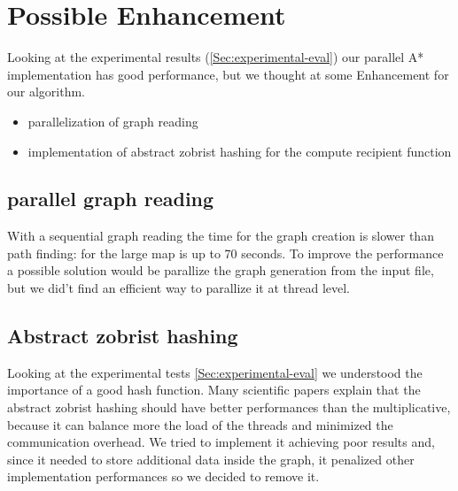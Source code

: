 \section{Possible Enhancement}
\label{Sec:enhancement}

Looking at the experimental results (\ref{Sec:experimental-eval}) our parallel A* implementation has good performance, 
but we thought at some Enhancement for our algorithm.

\begin{itemize}
    \item parallelization of graph reading
    \item implementation of abstract zobrist hashing for the compute recipient function
\end{itemize}

\subsection{parallel graph reading}

With a sequential graph reading the time for the graph creation is slower than path finding: for the large map is up to 70 seconds.
To improve the performance a possible solution would be parallize the graph generation from the input file, 
but we did't find an efficient way to parallize it at thread level.


\subsection{Abstract zobrist hashing}

Looking at the experimental tests \ref{Sec:experimental-eval} we understood the importance of a good hash function.
Many scientific papers explain that the abstract zobrist hashing should have better performances than the multiplicative,
because it can balance more the load of the threads and minimized the communication overhead.
We tried to implement it achieving poor results and, since it needed to store additional data inside the graph, it penalized 
other implementation performances so we decided to remove it.




